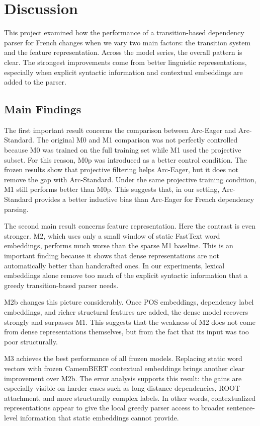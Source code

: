 \documentclass[12pt,letterpaper]{article}
\begin{document}
\section{Discussion}
\label{sec:discussion}

This project examined how the performance of a transition-based dependency
parser for French changes when we vary two main factors: the transition
system and the feature representation. Across the model series, the overall
pattern is clear. The strongest improvements come from better linguistic
representations, especially when explicit syntactic information and
contextual embeddings are added to the parser.

\subsection{Main Findings}
\label{subsec:findings}

The first important result concerns the comparison between Arc-Eager and
Arc-Standard. The original M0 and M1 comparison was not perfectly controlled
because M0 was trained on the full training set while M1 used the projective
subset. For this reason, M0p was introduced as a better control condition.
The frozen results show that projective filtering helps Arc-Eager, but it
does not remove the gap with Arc-Standard. Under the same projective
training condition, M1 still performs better than M0p. This suggests that,
in our setting, Arc-Standard provides a better inductive bias than
Arc-Eager for French dependency parsing.

The second main result concerns feature representation. Here the contrast is
even stronger. M2, which uses only a small window of static FastText word
embeddings, performs much worse than the sparse M1 baseline. This is an
important finding because it shows that dense representations are not
automatically better than handcrafted ones. In our experiments, lexical
embeddings alone remove too much of the explicit syntactic information that a
greedy transition-based parser needs.

M2b changes this picture considerably. Once POS embeddings, dependency label
embeddings, and richer structural features are added, the dense model
recovers strongly and surpasses M1. This suggests that the weakness of M2
does not come from dense representations themselves, but from the fact that
its input was too poor structurally.

M3 achieves the best performance of all frozen models. Replacing static word
vectors with frozen CamemBERT contextual embeddings brings another clear
improvement over M2b. The error analysis supports this result: the gains are
especially visible on harder cases such as long-distance dependencies, ROOT
attachment, and more structurally complex labels. In other words,
contextualized representations appear to give the local greedy parser access
to broader sentence-level information that static embeddings cannot provide.
\end{document}
